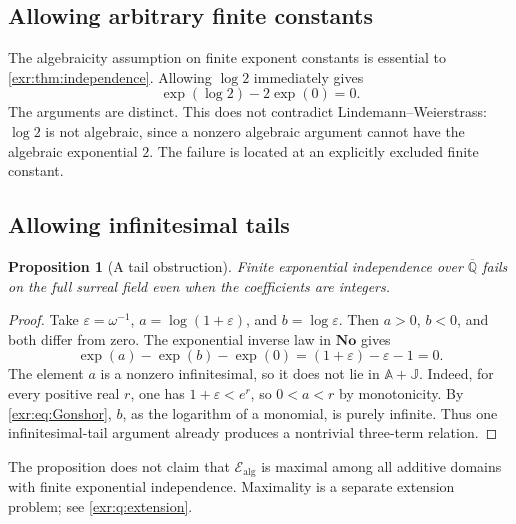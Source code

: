 \documentclass[11pt,letterpaper]{article}
\numberwithin{equation}{section}
\newtheorem{proposition}[proposition]{Proposition}
\theoremstyle{definition}
\theoremstyle{remark}
\newcommand{\No}{\mathbf{No}}
\newcommand{\A}{\mathbb A}
\newcommand{\Qb}{\overline{\mathbb Q}}
\newcommand{\J}{\mathbb J}
\newcommand{\Ealg}{\mathcal E_{\mathrm{alg}}}
\begin{document}
\subsection{Allowing arbitrary finite constants}
The algebraicity assumption on finite exponent constants is essential to
\cref{exr:thm:independence}. Allowing $\log2$ immediately gives
\begin{equation} \exp(\log2)-2\exp(0)=0. \end{equation}
The arguments are distinct. This does not contradict Lindemann--Weierstrass:
$\log2$ is not algebraic, since a nonzero algebraic argument cannot have the
algebraic exponential $2$. The failure is located at an explicitly excluded
finite constant.

\subsection{Allowing infinitesimal tails}
\begin{proposition}[A tail obstruction]\label{exr:prop:tails}
Finite exponential independence over $\Qb$ fails on the full surreal field even
when the coefficients are integers.
\end{proposition}
\begin{proof}
Take $\varepsilon=\omega^{-1}$, $a=\log(1+\varepsilon)$, and
$b=\log\varepsilon$. Then $a>0$, $b<0$, and both differ from zero. The
exponential inverse law in $\No$ gives
\begin{equation}\label{exr:eq:tailcounterexample}
 \exp(a)-\exp(b)-\exp(0)=(1+\varepsilon)-\varepsilon-1=0.
\end{equation}
The element $a$ is a nonzero infinitesimal, so it does not lie in $\A+\J$.
Indeed, for every positive real $r$, one has $1+\varepsilon<e^r$, so
$0<a<r$ by monotonicity. By \eqref{exr:eq:Gonshor}, $b$, as the logarithm of a
monomial, is purely infinite. Thus one infinitesimal-tail argument already
produces a nontrivial three-term relation.
\end{proof}

The proposition does not claim that $\Ealg$ is maximal among all additive domains
with finite exponential independence. Maximality is a separate extension problem;
see \cref{exr:q:extension}.
\end{document}
